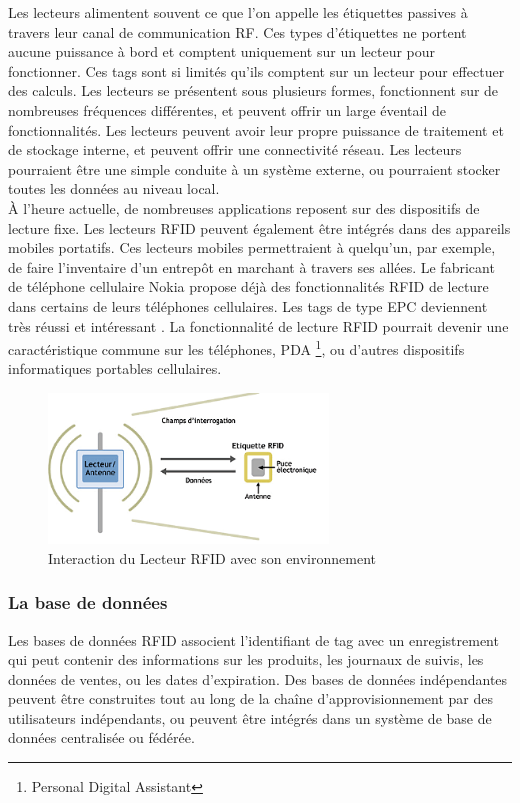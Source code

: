 \documentclass[11pt, a4paper, twoside]{book}
\begin{document}
Les lecteurs alimentent souvent ce que l'on appelle les étiquettes passives à travers leur canal de communication RF.
Ces types d'étiquettes ne portent aucune puissance à bord et comptent uniquement sur un lecteur pour fonctionner. Ces tags sont si limités qu'ils comptent sur un lecteur pour effectuer des calculs.
Les lecteurs se présentent sous plusieurs formes, fonctionnent sur de nombreuses fréquences différentes, et peuvent offrir un large éventail de fonctionnalités. Les lecteurs peuvent avoir leur propre puissance de traitement et de stockage interne, et peuvent offrir une connectivité réseau. Les lecteurs pourraient être une simple conduite à un système externe, ou pourraient stocker toutes les données  au niveau local.\\

À l'heure actuelle, de nombreuses applications reposent sur des dispositifs de lecture fixe. Les lecteurs RFID peuvent également être intégrés dans des appareils mobiles portatifs. Ces lecteurs mobiles permettraient à quelqu'un, par exemple, de faire l'inventaire d'un entrepôt en marchant à travers ses allées. Le fabricant de téléphone cellulaire Nokia propose déjà des fonctionnalités RFID de lecture dans certains de leurs téléphones cellulaires. Les tags de type EPC deviennent très réussi et intéressant . La fonctionnalité de lecture RFID pourrait devenir une caractéristique commune sur les téléphones, PDA \footnote{Personal Digital Assistant}, ou d'autres dispositifs informatiques portables cellulaires.
\begin{figure}[H]
\centering
\includegraphics[height=4cm]{reader}
\caption{Interaction du Lecteur RFID avec son environnement}
\end{figure}
\subsubsection{La base de données}
Les bases de données RFID associent l'identifiant de tag avec un enregistrement qui peut contenir des informations sur les produits, les journaux de suivis, les données de ventes, ou les dates d'expiration. Des bases de données indépendantes peuvent être construites tout au long de la chaîne d'approvisionnement par des utilisateurs indépendants, ou peuvent être intégrés dans un système de base de données centralisée ou fédérée.\\
\end{document}
